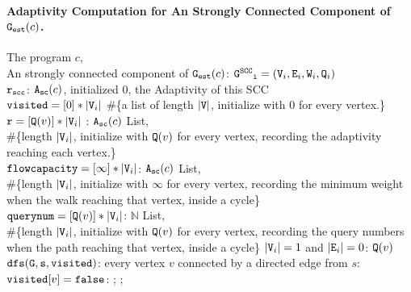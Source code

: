 \paragraph*{Adaptivity Computation for An Strongly Connected Component of $\mathtt{{G_{est}}}(c)$.}
\begin{algorithm}
 \caption{
 {Adaptivity Computation on An SCC ({$\kw{\pathsearch_{scc}(c, \sccgraph_i)}$})}
 \label{alg:adaptscc}
 }
 \begin{algorithmic}[1]
 \REQUIRE 
 The program $c$, 
 \\ \qquad
 An strongly connected component of $\mathtt{{G_{est}}}(c)$: 
 $ \mathtt{\mathtt{G^{SCC}}_i} = (\mathtt{V}_i, \mathtt{E}_i, \mathtt{W}_i, \mathtt{Q}_i)$
 \\
 $\mathtt{r_{scc}}$: ${\mathtt{A_{sc}}}(c)$, initialized $0$, the Adaptivity of this SCC
 \STATE {} 
 \\ \qquad $\mathtt{visited} = [0]*|\mathtt{V}_i|$ \#\{a list of length $|\mathtt{V}|$, initialize with $0$ for every vertex.\}
 \\ \qquad $\mathtt{r} = [\mathtt{Q}(v)]* |\mathtt{V}_i|$ : ${\mathtt{A_{sc}}}(c)$ List, 
 \\ \qquad \#\{length $|\mathtt{V}_i|$, initialize with $\mathtt{Q}(v)$ for every vertex, recording the adaptivity reaching each vertex.\}
 \\ \qquad $\mathtt{flowcapacity} = [\infty]* |\mathtt{V}_i|$: ${\mathtt{A_{sc}}}(c)$ List, 
 \\ \qquad \#\{length $|\mathtt{V}_i|$, initialize with $\infty$ for every vertex,
 recording the minimum weight when the walk reaching 
 that vertex, inside a cycle\}
 \\ \qquad $\mathtt{querynum} = [\mathtt{Q}(v)]* |\mathtt{V}_i|$: $\mathbb{N}$ List,
 \\ \qquad \#\{length $|\mathtt{V}_i|$, initialize with $\mathtt{Q}(v)$ for every vertex, 
 recording the query numbers when the path reaching 
 that vertex, inside a cycle\}
  $|\mathtt{V}_i| = 1$ and $|\mathtt{E}_i| = 0$:
 \STATE {} $\mathtt{Q}(v)$
  {$\mathtt{dfs(G,s,visited)}$}:
 \STATE {} every vertex $v$ 
 connected by a directed edge from $s$:
 \STATE \qquad {} $\mathtt{visited}[v] = \mathtt{false}$:
 \STATE \qquad \qquad \qquad {};
 \STATE \qquad \qquad \qquad {};

\end{algorithmic}
\end{algorithm}

